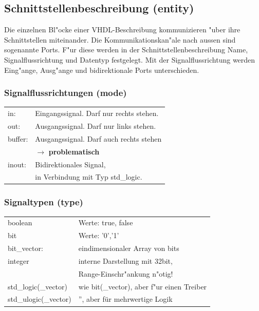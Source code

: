 \subsection{Schnittstellenbeschreibung (entity)}
	Die einzelnen Bl"ocke einer VHDL-Beschreibung kommunizieren "uber ihre 
	Schnittstellen miteinander. Die Kommunikationskan"ale nach aussen sind sogenannte Ports. F"ur diese werden in der Schnittstellenbeschreibung Name, Signalflussrichtung und Datentyp festgelegt. Mit der Signalflussrichtung werden Eing"ange, Ausg"ange und bidirektionale Ports unterschieden.
	\vspace{-\baselineskip}
	\begin{multicols}{2}
		
		
	\end{multicols}
\begin{multicols}{2}
\subsubsection{Signalflussrichtungen (mode)}
	\begin{tabular}{ll}
		in: & Eingangssignal. Darf nur rechts stehen.\\
		out: & Ausgangssignal. Darf nur links stehen.\\
		buffer: & Ausgangssignal. Darf auch rechts stehen\\
		&  $\rightarrow$ \textbf{problematisch}\\
		inout: & Bidirektionales Signal, \\
		& in Verbindung mit Typ std\_logic.\\
	\end{tabular}
\vfill\null
\subsubsection{Signaltypen (type)}
	\begin{tabular}{ll}
		boolean & Werte: true, false\\
		bit & Werte: '0','1'\\
		bit\_vector: & eindimensionaler Array von bits\\
		integer & interne Darstellung mit 32bit,\\
		& Range-Einschr"ankung n"otig!\\
		std\_logic(\_vector) & wie bit(\_vector), aber f"ur einen Treiber\\
		std\_ulogic(\_vector) & '', aber für mehrwertige Logik\\
	\end{tabular}
\end{multicols}
	
